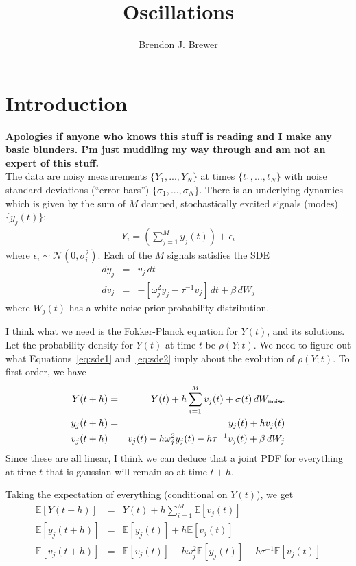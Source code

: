 \documentclass[letterpaper, 11pt]{article}
\title{Oscillations}
\author{Brendon J. Brewer}
\newcommand{\E}{\mathds{E}}
\begin{document}
\maketitle

\section{Introduction}
{\bf Apologies if anyone who knows this stuff is reading and I make any basic
blunders. I'm just muddling my way through and am not an expert of this stuff.}\\

The data are noisy measurements $\{Y_1, ..., Y_N\}$ at times
$\{t_1, ..., t_N\}$ with noise standard deviations (``error bars'')
$\{\sigma_1, ..., \sigma_N\}$. There is an underlying dynamics which is
given by the sum of $M$ damped, stochastically excited signals (modes)
$\{y_j(t)\}$:
\begin{eqnarray}
Y_i = \left(\sum_{j=1}^M y_j(t)\right) + \epsilon_i
\end{eqnarray}
where $\epsilon_i \sim \mathcal{N}(0, \sigma_i^2)$.
Each of the $M$ signals satisfies the SDE
\begin{eqnarray}
dy_j &=& v_j \,dt\label{eq:sde1}\\
dv_j &=& -\left[\omega_j^2y_j - \tau^{-1}v_j\right] \,dt + \beta \,dW_j\label{eq:sde2}
\end{eqnarray}
where $W_j(t)$ has a white noise prior probability distribution.

I think what we need is the Fokker-Planck equation for $Y(t)$, and its
solutions. Let the probability density for $Y(t)$ at time $t$ be
$\rho(Y; t)$. We need to figure out what Equations~\ref{eq:sde1}
and~\ref{eq:sde2} imply about the evolution of $\rho(Y; t)$.
To first order, we have
\begin{eqnarray}
Y(t+h) &=& Y(t) + h\sum_{i=1}^M v_j(t) + \sigma(t)\,dW_{\rm noise}\\
y_j(t + h) &=& y_j(t) + h v_j(t)\\
v_j(t + h) &=& v_j(t) - h\omega_j^2y_j(t) - h\tau^{-1}v_j(t) + \beta \,dW_j
\end{eqnarray}
Since these are all linear, I think we can deduce that a joint PDF for
everything at time $t$ that is gaussian will remain so at time $t+h$.

Taking the expectation of everything (conditional on $Y(t)$), we get
\begin{eqnarray}
\E\left[Y(t+h)\right] &=& Y(t) + h\sum_{i=1}^M \E\left[v_j(t)\right]\\
\E\left[y_j(t + h)\right] &=& \E\left[y_j(t)\right] + h\E\left[v_j(t)\right]\\
\E\left[v_j(t + h)\right] &=& \E\left[v_j(t)\right] - h\omega_j^2\E\left[y_j(t)\right] - h\tau^{-1}\E\left[v_j(t)\right]
\end{eqnarray}
\end{document}
